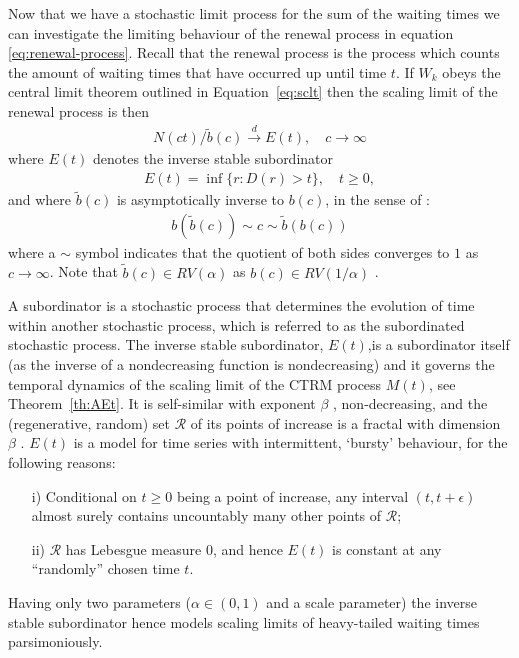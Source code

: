 \documentclass[honours,12pt]{UNSWthesis}
\newcommand{\1}{\mathbf 1}
\newcommand{\cd}{\overset{d}{\longrightarrow}}
\numberwithin{equation}{section}
\theoremstyle{definition}
\theoremstyle{remark}
\begin{document}
Now that we have a stochastic limit process for the sum of the waiting times we can investigate the limiting behaviour of the renewal process in equation \ref{eq:renewal-process}. Recall that the renewal process is the process which counts the amount of waiting times that have occurred up until time $t$. If $W_k$ obeys the central limit theorem outlined in Equation~\ref{eq:sclt} then the scaling limit of the renewal process is then \cite{limitCTRW}
\begin{align}
N(ct) / \tilde b(c) \cd E(t), \quad c \to \infty
\end{align}
where $E(t)$ denotes the inverse stable subordinator \cite{invSubord}
\begin{align}
E(t) = \inf\{r: D(r) > t\}, \quad t \ge 0,
\end{align}
and where $\tilde b(c)$ is asymptotically inverse to $b(c)$, in the sense
of \cite[p.20]{seneta}: 
\begin{align}
b(\tilde b(c)) \sim c \sim \tilde b(b(c))
\end{align}
where a $\sim$ symbol indicates that the quotient of both sides converges to
$1$ as $c \to \infty$. 
Note that $\tilde b(c) \in RV(\alpha)$ as $b(c) \in RV(1/\alpha)$ \cite[Prop~4.15]{MeerschaertSikorskii2012}. 

A subordinator is a stochastic process that determines the evolution of time within another stochastic process, which is referred to as the subordinated stochastic process. The inverse stable subordinator, $E(t)$,is a subordinator itself (as the inverse of a nondecreasing function is nondecreasing) and it governs the temporal dynamics of
the scaling limit of the CTRM process $M(t)$, see Theorem~\ref{th:AEt}. 
It is self-similar with exponent $\beta$
\cite{limitCTRW}, non-decreasing, and the (regenerative, random) set 
$\mathcal R$ of its points of increase is a fractal with dimension $\beta$ 
\cite{Bertoin04}.
$E(t)$ is a model for time series with intermittent, `bursty'
behaviour, for the following reasons:
\begin{itemize}
\item [i)]
Conditional on $t \ge 0$ being a point of increase, any interval 
$(t, t+ \epsilon)$ almost surely contains uncountably many other points of 
$\mathcal R$; 
\item [ii)]
$\mathcal R$ has Lebesgue measure $0$, and hence $E(t)$ is
constant at any ``randomly'' chosen time $t$. 
\end{itemize}
Having only two parameters ($\alpha \in (0,1)$ and a scale parameter)
the inverse stable subordinator hence models scaling limits of heavy-tailed 
waiting times parsimoniously.
\end{document}
